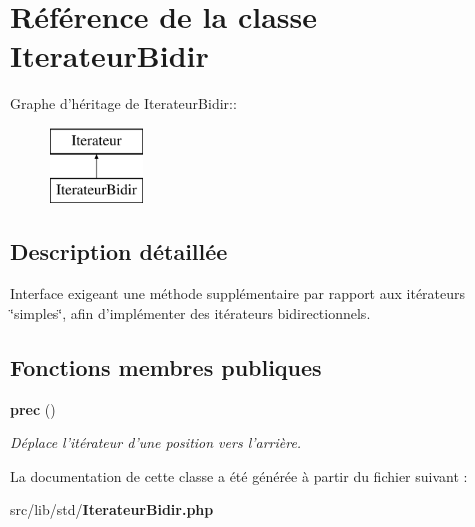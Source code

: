 \section{Référence de la classe IterateurBidir}
\label{class_iterateur_bidir}
Graphe d'héritage de IterateurBidir::\begin{figure}[H]
\begin{center}
\leavevmode
\includegraphics[height=2cm]{class_iterateur_bidir}
\end{center}
\end{figure}


\subsection{Description détaillée}
Interface exigeant une méthode supplémentaire par rapport aux itérateurs \char`\"{}simples\char`\"{}, afin d'implémenter des itérateurs bidirectionnels. \subsection*{Fonctions membres publiques}
\begin{CompactItemize}
\item 
{\bf prec} ()\label{class_iterateur_bidir_c168276a3bf249dc56d2287e7c07455e}

\begin{CompactList}\small\item\em Déplace l'itérateur d'une position vers l'arrière. \item\end{CompactList}\end{CompactItemize}


La documentation de cette classe a été générée à partir du fichier suivant :\begin{CompactItemize}
\item 
src/lib/std/{\bf IterateurBidir.php}\end{CompactItemize}
